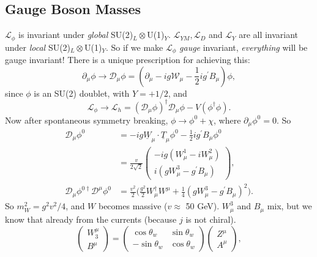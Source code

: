 \subsection{Gauge Boson Masses}
%
$\mathcal{L}_\phi$ is invariant under \textit{global} SU(2)$_L \otimes$U(1)$_Y$. $\mathcal{L}_{YM}, \mathcal{L}_D$ and $\mathcal{L}_{Y}$ are all invariant under \textit{local} SU(2)$_L \otimes$U(1)$_Y$. So if we make $\mathcal{L}_\phi$ \textit{gauge} invariant, \textit{everything} will be gauge invariant! There is a unique prescription for achieving this:
\begin{equation}
\partial_\mu \phi \to \mathcal{D}_\mu \phi = (\partial_\mu - ig \mathcal{W}_\mu - \frac{1}{2} ig^\prime B_\mu) \phi,
\end{equation}
since $\phi$ is an SU(2) doublet, with $Y = +1/2$, and
\begin{equation}
\mathcal{L}_\phi \to \mathcal{L}_h = (\mathcal{D}_\mu \phi)^\dagger \mathcal{D}_\mu \phi - V(\phi^\dagger \phi).
\end{equation}
Now after spontaneous symmetry breaking, $\phi \to \phi^0 + \chi$, where $\partial_\mu \phi^0 = 0$. So
\begin{equation}
\begin{split}
\mathcal{D}_\mu \phi^0 &= -ig \underline{W}_\mu \cdot \underline{T}_\mu \phi^0 - \frac{1}{2} i g^\prime B_\mu \phi^0 \\
&= \frac{v}{2\sqrt{2}} 
\begin{pmatrix}  
-ig(W_\mu^1 - i W_\mu^2) \\
i(gW_\mu^3 - g^\prime B_\mu)
\end{pmatrix}, \\
\mathcal{D}_\mu \phi^{0 \dagger} \mathcal{D}^\mu \phi^0 &= \frac{v^2}{2} \bigg(\frac{g^2}{2} W_\mu^\dagger W^\mu + \frac{1}{4}(g W_\mu^3 - g^\prime B_\mu)^2 \bigg).
\end{split}
\end{equation}
So $m_W^2 = g^2v^2/4$, and $W$ becomes massive ($v \approx$ 50 GeV). $W_\mu^3$ and $B_\mu$ mix, but we know that already from the currents (because $j$ is not chiral).  
\[\left( \begin{array}{cc}
W^\mu_3 \\
B^\mu 
\end{array} \right) =
 \left( \begin{array}{cc}
\cos\theta_w & \sin\theta_w  \\
-\sin\theta_w & \cos\theta_w  \end{array} \right) 
\left( \begin{array}{cc}
Z^\mu \\
A^\mu 
\end{array} \right), \]
